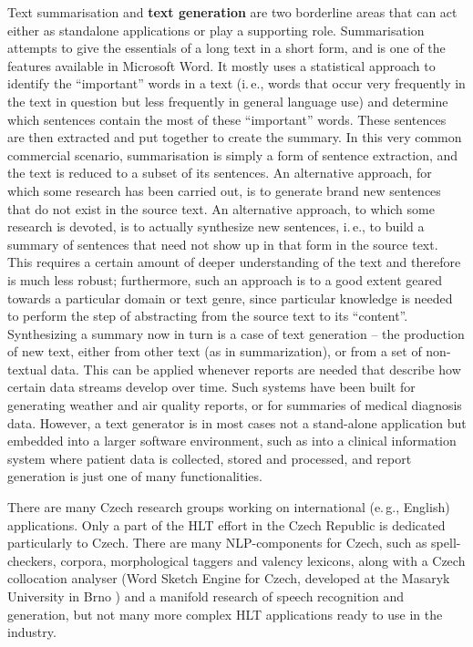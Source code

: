 \begin{multicols}{2}

Text summarisation and \textbf{text generation} are two borderline areas that can act either as standalone applications or play a supporting role. Summarisation attempts to give the essentials of a long text in a short form, and is one of the features available in Microsoft Word. It mostly uses a statistical approach to identify the “important” words in a text (i.\,e., words that occur very frequently in the text in question but less frequently in general language use) and determine which sentences contain the most of these “important” words. These sentences are then extracted and put together to create the summary. In this very common commercial scenario, summarisation is simply a form of sentence extraction, and the text is reduced to a subset of its sentences. An alternative approach, for which some research has been carried out, is to generate brand new sentences that do not exist in the source text.
An alternative approach, to which some research is devoted, is to actually synthesize new sentences, i.\,e., to build a summary of sentences that need not show up in that form in the source text. This requires a certain amount of deeper understanding of the text and therefore is much less robust; furthermore, such an approach is to a good extent geared towards a particular domain or text genre, since particular knowledge is needed to perform the step of abstracting from the source text to its “content”. Synthesizing a summary now in turn is a case of text generation -- the production of new text, either from other text (as in summarization), or from a set of non-textual data. This can be applied whenever reports are needed that describe how certain data streams develop over time. Such systems have been built for generating weather and air quality reports, or for summaries of medical diagnosis data. However, a text generator is in most cases not a stand-alone application but embedded into a larger software environment, such as into a clinical information system where patient data is collected, stored and processed, and report generation is just one of many functionalities.

There are many Czech research groups working on international (e.\,g., English) applications. Only a part of the HLT effort in the Czech Republic is dedicated particularly to Czech. There are many NLP-components for Czech, such as spell-checkers, corpora, morphological taggers and valency lexicons, along with a Czech collocation analyser (Word Sketch Engine for Czech, developed at the Masaryk University in Brno \cite{Horak2009}) and a manifold research of speech recognition and generation, but not many more complex HLT applications ready to use in the industry.


\end{multicols}
